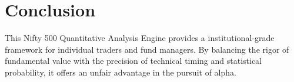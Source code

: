 \documentclass{article}
\begin{document}
\section{Conclusion}
This Nifty 500 Quantitative Analysis Engine provides a institutional-grade framework for individual traders and fund managers. By balancing the rigor of fundamental value with the precision of technical timing and statistical probability, it offers an unfair advantage in the pursuit of alpha.
\end{document}
